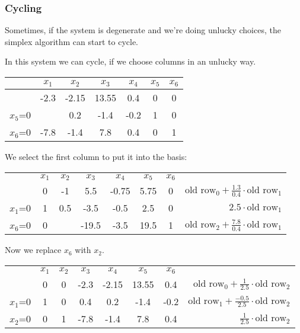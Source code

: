 \subsubsection{Cycling}

Sometimes, if the system is degenerate and we're doing unlucky choices, the simplex algorithm can start to cycle.

\begin{Ex}[Cycling]\label{Ex:cycling} In this system we can cycle, if we choose columns in an unlucky way.
\begin{center}
\begin{tabular}{c|cccccc}
    & $x_1$ & $x_2$ & $x_3$ & $x_4$ & $x_5$ & $x_6$\\\hline
    & -2.3 & -2.15 & 13.55 & 0.4 & 0 & 0\\\hline
$x_5$=0 & \cellcolor{gruen}{\bf 0.4} & 0.2 & -1.4 & -0.2 & 1 & 0 \\
$x_6$=0 & -7.8 & -1.4 & 7.8 & 0.4 & 0 & 1\\
\end{tabular}
\end{center}

We select the first column to put it into the basis:

\begin{center}
\begin{tabular}{c|ccccccr}
    & $x_1$ & $x_2$ & $x_3$ & $x_4$ & $x_5$ & $x_6$\\\cline{1-7}
    & 0 & -1 & 5.5 & -0.75 & 5.75 & 0&\hspace{1cm} $\text{old row}_0 + \frac{1.3}{0.4}\cdot \text{old row}_1$\\\cline{1-7}
$x_1$=0 & 1 & 0.5 & -3.5 & -0.5 & 2.5 & 0 &\hspace{1cm} $2.5 \cdot \text{old row}_1$\\
$x_6$=0 & 0 & \cellcolor{gruen}{\bf 2.5} & -19.5 & -3.5 & 19.5 & 1&\hspace{1cm} $\text{old row}_2 + \frac{7.8}{0.4}\cdot \text{old row}_1$\\
\end{tabular}
\end{center}

Now we replace $x_6$ with $x_2$.

\begin{center}
\begin{tabular}{c|ccccccr}
    & $x_1$ & $x_2$ & $x_3$ & $x_4$ & $x_5$ & $x_6$\\\cline{1-7}
    & 0 & 0 & -2.3 & -2.15 & 13.55 & 0.4&\hspace{1cm} $\text{old row}_0 + \frac{1}{2.5}\cdot \text{old row}_2$\\\cline{1-7}
$x_1$=0 & 1 & 0 & 0.4 & 0.2 & -1.4 & -0.2&\hspace{1cm} $\text{old row}_1 + \frac{-0.5}{2.5}\cdot \text{old row}_2$ \\
$x_2$=0 & 0 & 1 & -7.8 & -1.4 & 7.8 & 0.4&\hspace{1cm} $\frac{1}{2.5} \cdot \text{old row}_2$\\
\end{tabular}
\end{center}


\end{Ex}
